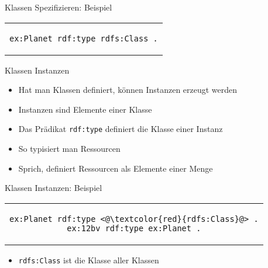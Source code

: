 \documentclass{beamer}
\begin{document}
\begin{frame}[fragile]{Klassen Spezifizieren: Beispiel}
	
    \begin{center}
    	\begin{tabular}{c}
			\begin{lstlisting}
ex:Planet rdf:type rdfs:Class .
			\end{lstlisting}
		\end{tabular}
	\end{center}
	
\end{frame}

\begin{frame}{Klassen Instanzen}
	
	\begin{itemize}
		\item Hat man Klassen definiert, können Instanzen erzeugt werden
		\item Instanzen sind Elemente einer Klasse
		\item Das Prädikat \texttt{rdf:type} definiert die Klasse einer Instanz
		\item So typisiert man Ressourcen
		\item Sprich, definiert Ressourcen als Elemente einer Menge
	\end{itemize}
	
\end{frame}

\begin{frame}[fragile]{Klassen Instanzen: Beispiel}
	
    \begin{center}
    	\begin{tabular}{c}
    		\begin{lstlisting}
ex:Planet rdf:type <@\textcolor{red}{rdfs:Class}@> .
ex:12bv rdf:type ex:Planet .
    		\end{lstlisting}
    	\end{tabular}
    \end{center}
    
    \vspace{0.5cm}
    
	\begin{itemize}
		\item \texttt{rdfs:Class} ist die Klasse aller Klassen
	\end{itemize}
	
\end{frame}
\end{document}
